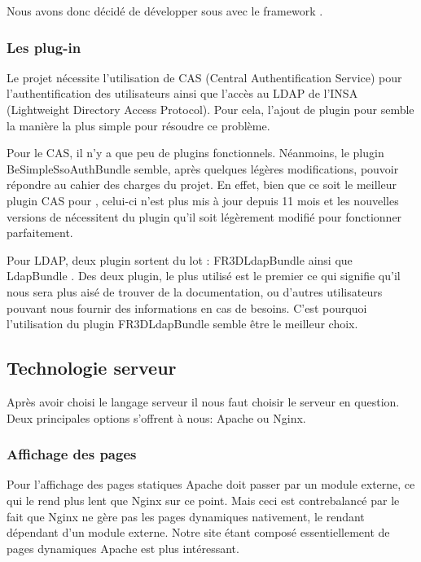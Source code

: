 \medbreak

Nous avons donc décidé de développer sous \php avec le framework \symfony.

\subsubsection{Les plug-in \symfony}

Le projet nécessite l'utilisation de CAS (Central Authentification Service) pour l'authentification des utilisateurs ainsi que l'accès au LDAP de l'INSA (Lightweight Directory Access Protocol). Pour cela, l'ajout de plugin pour \symfony semble la manière la plus simple pour résoudre ce problème.

Pour le CAS, il n'y a que peu de plugins \symfony fonctionnels. Néanmoins, le plugin \og BeSimpleSsoAuthBundle \fg semble, après quelques légères modifications, pouvoir répondre au cahier des charges du projet. En effet, bien que ce soit le meilleur plugin CAS pour \symfony, celui-ci n'est plus mis à jour depuis 11 mois et les nouvelles versions de \symfony nécessitent du plugin qu'il soit légèrement modifié pour fonctionner parfaitement.

Pour LDAP, deux plugin sortent du lot : \og FR3DLdapBundle \fg ainsi que \og LdapBundle \fg. Des deux plugin, le plus utilisé est le premier ce qui signifie qu'il nous sera plus aisé de trouver de la documentation, ou d’autres utilisateurs pouvant nous fournir des informations en cas de besoins. C'est pourquoi l'utilisation du plugin \og FR3DLdapBundle \fg semble être le meilleur choix.

\subsection{Technologie serveur}

Après avoir choisi le langage serveur il nous faut choisir le serveur en question. Deux principales options s'offrent à nous: Apache ou Nginx.

\subsubsection{Affichage des pages}
Pour l'affichage des pages statiques Apache doit passer par un module externe, ce qui le rend plus lent que Nginx sur ce point.
Mais ceci est contrebalancé par le fait que Nginx ne gère pas les pages dynamiques nativement, le rendant dépendant d'un module externe.
Notre site étant composé essentiellement de pages dynamiques Apache est plus intéressant.

